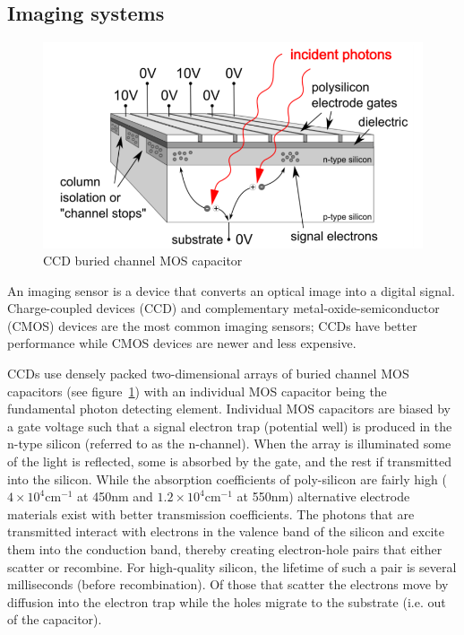 \subsection{Imaging systems}\label{subsec:imaging-systems}
\begin{figure}
    \includegraphics[width=\linewidth,keepaspectratio]{figures/bccd.png}
    \caption{CCD buried channel MOS capacitor\cite{finaltestguideline}}
    \label{fig:mos-cap}
\end{figure}
An imaging sensor is a device that converts an optical image into a digital signal.
%
Charge-coupled devices (CCD) and complementary metal-oxide-semiconductor (CMOS) devices are the most common imaging sensors; CCDs have better performance while CMOS devices are newer and less expensive.

CCDs use densely packed two-dimensional arrays of buried channel MOS capacitors (see figure~\ref{fig:mos-cap}) with an individual MOS capacitor being the fundamental photon detecting element.
%
Individual MOS capacitors are biased by a gate voltage such that a signal electron trap (potential well) is produced in the n-type silicon (referred to as the n-channel).
%
When the array is illuminated some of the light is reflected, some is absorbed by the gate, and the rest if transmitted into the silicon.
%
While the absorption coefficients of poly-silicon are fairly high ($4\times 10^4\text{cm}^{-1}$ at 450nm and $1.2\times 10^4\text{cm}^{-1}$ at 550nm) alternative electrode materials exist with better transmission coefficients\cite{Bass:2009:HOT:1594759}.
%
The photons that are transmitted interact with electrons in the valence band of the silicon and excite them into the conduction band, thereby creating electron-hole pairs that either scatter or recombine.
%
For high-quality silicon, the lifetime of such a pair is several milliseconds (before recombination)\cite{scientificccd}.
%
Of those that scatter the electrons move by diffusion into the electron trap while the holes migrate to the substrate (i.e. out of the capacitor).

